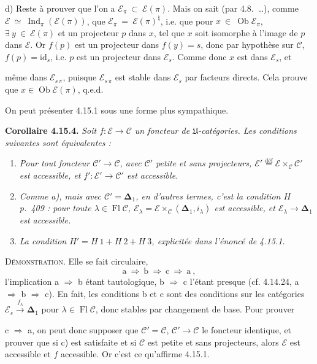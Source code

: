 \documentclass[11pt]{article}
\newcommand{\msp}[1]{\marginpar{\footnotesize [#1]}}
\newcommand{\cE}{\mathcal{E}}
\newcommand{\cC}{\mathcal{C}}
\newcommand{\Ob}{\operatorname{Ob}}
\newcommand{\Fl}{\operatorname{Fl}}
\newcommand{\Ind}{\operatorname{Ind}}
\newcommand{\id}{\mathrm{id}}
\begin{document}
d) Reste à prouver que l'on a $\cE_{\pi} \ \subset \ \cE(\pi)$. Mais on sait (par 4.8.~\dots), comme $\cE \ \simeq \ \Ind_{\pi}(\cE(\pi))$, que $\cE_{\pi} \ = \ \cE(\pi)^{\natural}$, i.e. que pour $x \ \in \ \Ob \cE_{\pi}$, $\exists \ y \ \in \ \cE(\pi)$ et un projecteur $p$ dans $x$, tel que $x$ soit isomorphe à l'image de $p$ dans $\cE$. Or $f(p)$ est un projecteur dans $f(y) = s$, donc par hypothèse sur $\cC$, $f(p) = \id_s$, i.e. $p$ est un projecteur dans $\cE_s$. Comme donc $x$ est dans $\cE_s$, et

\msp{page 432}même dans $\cE_{s\,\pi}$, puisque $\cE_{s\,\pi}$ est stable dans $\cE_s$ par facteurs directs. Cela prouve que $x \in \Ob \cE(\pi)$, q.e.d.

On peut présenter 4.15.1 sous une forme plus sympathique.

\textbf{Corollaire 4.15.4.} \textit{Soit $f : \cE \longrightarrow \cC$ un foncteur de $\mathfrak{U}$-catégories. Les conditions suivantes sont équivalentes :}
\begin{enumerate}
\item[\textit{a)}] \textit{Pour tout foncteur $\cC' \longrightarrow \cC$, avec $\cC'$ petite et sans projecteurs, $\cE' \overset{\text{déf}}{=} \cE \times_{\cC} \cC'$ est accessible, et $f' : \cE' \longrightarrow \cC'$ est accessible.}
\item[\textit{b)}] \textit{Comme a), mais avec $\cC' = \mathbf{\Delta}_1$, en d'autres termes, c'est la condition $H$ p.~409 : pour toute $\lambda \in \Fl \cC$, $\cE_{\lambda} = \cE \times_{\cC} (\mathbf{\Delta}_1, i_{\lambda})$ est accessible, et $\cE_{\lambda} \longrightarrow \mathbf{\Delta}_1$ est accessible.}
\item[\textit{c)}] \textit{La condition $H' = H\ \mathit{1} + H\ \mathit{2} + H\ \mathit{3}$, explicitée dans l'énoncé de 4.15.1.}
\end{enumerate}
\textsc{Démonstration}. Elle se fait circulaire,
\[
\mathrm{a} \ \Longrightarrow \ \mathrm{b} \ \Longrightarrow \ \mathrm{c} \ \Longrightarrow \ \mathrm{a} \ ,
\]
l'implication a $\Longrightarrow$ b étant tautologique, b $\Longrightarrow$ c l'étant presque (cf. 4.14.24, a $\Longrightarrow$ b $\Longrightarrow$ c). En fait, les conditions b et c sont des conditions sur les catégories $\cE_s \xrightarrow{f_{\lambda}} \mathbf{\Delta}_1$ pour $\lambda \in \Fl \cC$, donc stables par changement de base. Pour prouver

\msp{page 433}c $\Longrightarrow$ a, on peut donc supposer que $\cC' = \cC$, $\cC' \longrightarrow \cC$ le foncteur identique, et prouver que si c) est satisfaite et si $\cC$ est petite et sans projecteurs, alors $\cE$ est accessible et $f$ accessible. Or c'est ce qu'affirme 4.15.1.
\end{document}
